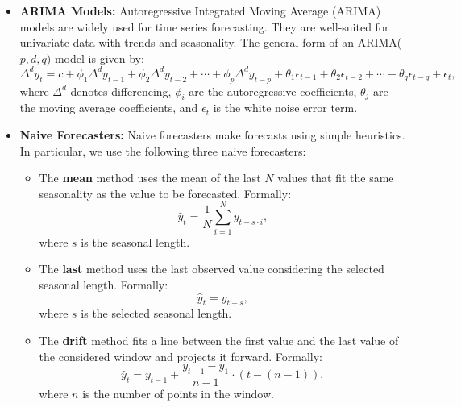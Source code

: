 \documentclass{article}
\begin{document}
\begin{itemize}
    \item \textbf{ARIMA Models:} Autoregressive Integrated Moving Average (ARIMA) models are widely used for time series forecasting. They are well-suited for univariate data with trends and seasonality. The general form of an ARIMA(\(p, d, q\)) model is given by:
    \begin{equation}
    \Delta^d y_t = c + \phi_1 \Delta^d y_{t-1} + \phi_2 \Delta^d y_{t-2} + \cdots + \phi_p \Delta^d y_{t-p} + \theta_1 \epsilon_{t-1} + \theta_2 \epsilon_{t-2} + \cdots + \theta_q \epsilon_{t-q} + \epsilon_t,
    \end{equation}
    where \(\Delta^d\) denotes differencing, \(\phi_i\) are the autoregressive coefficients, \(\theta_j\) are the moving average coefficients, and \(\epsilon_t\) is the white noise error term.
    
    \item \textbf{Naive Forecasters:} Naive forecasters make forecasts using simple heuristics. In particular, we use the following three naive forecasters:
    \begin{itemize}
        \item The \textbf{mean} method uses the mean of the last \(N\) values that fit the same seasonality as the value to be forecasted. Formally:
        \begin{equation}
            \hat{y}_t = \frac{1}{N} \sum_{i=1}^N y_{t-s \cdot i},
        \end{equation}
        where \(s\) is the seasonal length.
        \item The \textbf{last} method uses the last observed value considering the selected seasonal length. Formally:
        \begin{equation}
            \hat{y}_t = y_{t-s},
        \end{equation}
        where \(s\) is the selected seasonal length.
        \item The \textbf{drift} method fits a line between the first value and the last value of the considered window and projects it forward. Formally:
        \begin{equation}
            \hat{y}_t = y_{t-1} + \frac{y_{t-1} - y_1}{n-1} \cdot (t - (n-1)),
        \end{equation}
        where \(n\) is the number of points in the window.
    \end{itemize}


\end{itemize}
\end{document}
